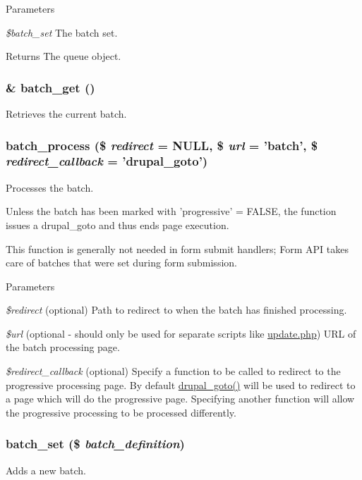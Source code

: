 \begin{DoxyParams}{Parameters}
\item[{\em \$batch\_\-set}]The batch set.\end{DoxyParams}
\begin{DoxyReturn}{Returns}
The queue object. 
\end{DoxyReturn}
\hypertarget{group__batch_ga971f5246c6e8e536d0b20529fb2e2638}{
\subsubsection[{batch\_\-get}]{\setlength{\rightskip}{0pt plus 5cm}\& batch\_\-get ()}}
\label{group__batch_ga971f5246c6e8e536d0b20529fb2e2638}
Retrieves the current batch. \hypertarget{group__batch_gab17f59692632a482cee4f65f27d082f7}{
\subsubsection[{batch\_\-process}]{\setlength{\rightskip}{0pt plus 5cm}batch\_\-process (\$ {\em redirect} = {\ttfamily NULL}, \/  \$ {\em url} = {\ttfamily 'batch'}, \/  \$ {\em redirect\_\-callback} = {\ttfamily 'drupal\_\-goto'})}}
\label{group__batch_gab17f59692632a482cee4f65f27d082f7}
Processes the batch.

Unless the batch has been marked with 'progressive' = FALSE, the function issues a drupal\_\-goto and thus ends page execution.

This function is generally not needed in form submit handlers; Form API takes care of batches that were set during form submission.


\begin{DoxyParams}{Parameters}
\item[{\em \$redirect}](optional) Path to redirect to when the batch has finished processing. \item[{\em \$url}](optional -\/ should only be used for separate scripts like \hyperlink{update_8php}{update.php}) URL of the batch processing page. \item[{\em \$redirect\_\-callback}](optional) Specify a function to be called to redirect to the progressive processing page. By default \hyperlink{group__http__handling_ga5b68d7a934713d1d623b2b32a732235d}{drupal\_\-goto()} will be used to redirect to a page which will do the progressive page. Specifying another function will allow the progressive processing to be processed differently. \end{DoxyParams}
\hypertarget{group__batch_ga9ff3f18b3bdd1d62ab7ac681a22a7170}{
\subsubsection[{batch\_\-set}]{\setlength{\rightskip}{0pt plus 5cm}batch\_\-set (\$ {\em batch\_\-definition})}}
\label{group__batch_ga9ff3f18b3bdd1d62ab7ac681a22a7170}
Adds a new batch.

